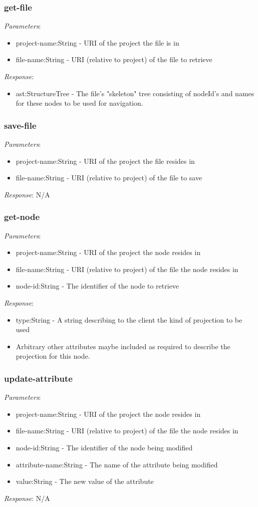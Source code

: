 \documentclass{report}
\begin{document}
\subsubsection{get-file}
\emph{Parameters}: 
\begin{itemize}
\item project-name:String - URI of the project the file is in
\item file-name:String - URI (relative to project) of the file to retrieve
\end{itemize}
\emph{Response}: 
\begin{itemize}
\item ast:StructureTree - The file's "skeleton" tree consisting of nodeId's and names for these nodes to be used for navigation.
\end{itemize}

\subsubsection{save-file}
\emph{Parameters}: 
\begin{itemize}
\item project-name:String - URI of the project the file resides in
\item file-name:String - URI (relative to project) of the file to save
\end{itemize}
\emph{Response}: N/A

\subsubsection{get-node}
\emph{Parameters}: 
\begin{itemize}
\item project-name:String - URI of the project the node resides in
\item file-name:String - URI (relative to project) of the file the node resides in
\item node-id:String - The identifier of the node to retrieve
\end{itemize}
\emph{Response}: 
\begin{itemize}
\item type:String - A string describing to the client the kind of projection to be used
\item Arbitrary other attributes maybe included as required to describe the projection for this node.
\end{itemize}
\subsubsection{update-attribute}
\emph{Parameters}: 
\begin{itemize}
\item project-name:String - URI of the project the node resides in
\item file-name:String - URI (relative to project) of the file the node resides in
\item node-id:String - The identifier of the node being modified
\item attribute-name:String - The name of the attribute being modified
\item value:String - The new value of the attribute
\end{itemize}
\emph{Response}: N/A
\end{document}
